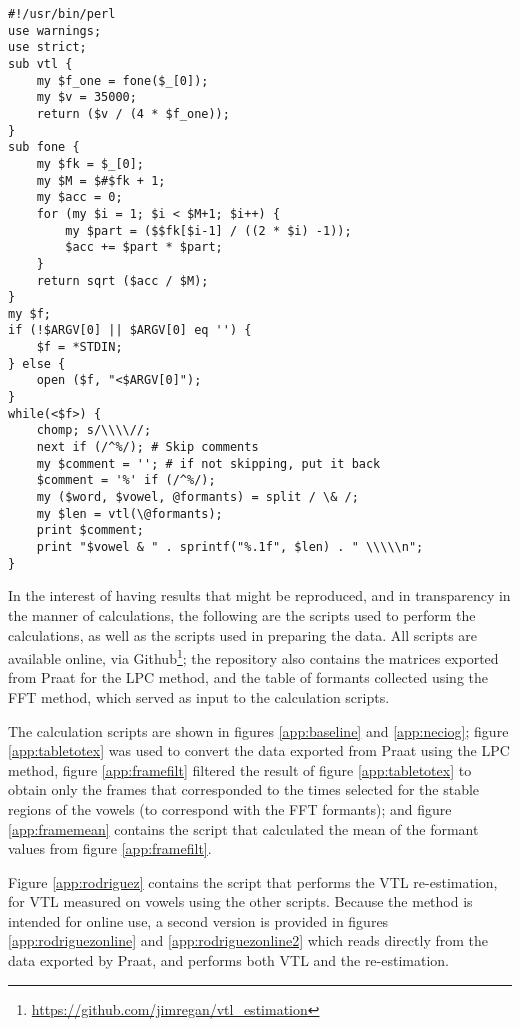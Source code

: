 \documentclass[11pt]{article}
\begin{document}
\begin{figure*}
\caption{Perl script to perform VTL using the method attributed to~\citet{necioglu2000unsupervised}.}
\label{app:neciog}
\begin{small}
\begin{verbatim}
#!/usr/bin/perl
use warnings;
use strict;
sub vtl {
    my $f_one = fone($_[0]);
    my $v = 35000;
    return ($v / (4 * $f_one));
}
sub fone {
    my $fk = $_[0];
    my $M = $#$fk + 1;
    my $acc = 0;
    for (my $i = 1; $i < $M+1; $i++) {
        my $part = ($$fk[$i-1] / ((2 * $i) -1));
        $acc += $part * $part;
    }
    return sqrt ($acc / $M);
}
my $f;
if (!$ARGV[0] || $ARGV[0] eq '') {
    $f = *STDIN;
} else {
    open ($f, "<$ARGV[0]");
}
while(<$f>) {
    chomp; s/\\\\//;
    next if (/^%/); # Skip comments
    my $comment = ''; # if not skipping, put it back
    $comment = '%' if (/^%/);
    my ($word, $vowel, @formants) = split / \& /;
    my $len = vtl(\@formants);
    print $comment;
    print "$vowel & " . sprintf("%.1f", $len) . " \\\\\n";
}
\end{verbatim}
\end{small}
\end{figure*}

In the interest of having results that might be reproduced, and in transparency in the manner of calculations, the following are the scripts used to perform the calculations, as well as the scripts used in preparing the data. All scripts are available online, via Github\footnote{\url{https://github.com/jimregan/vtl_estimation}}; the repository also contains the matrices exported from Praat for the LPC method, and the table of formants collected using the FFT method, which served as input to the calculation scripts.

The calculation scripts are shown in figures \ref{app:baseline} and \ref{app:neciog}; figure \ref{app:tabletotex} was used to convert the data exported from Praat using the LPC method, figure \ref{app:framefilt} filtered the result of figure \ref{app:tabletotex} to obtain only the frames that corresponded to the times selected for the stable regions of the vowels (to correspond with the FFT formants); and figure \ref{app:framemean} contains the script that calculated the mean of the formant values from figure \ref{app:framefilt}.

Figure \ref{app:rodriguez} contains the script that performs the VTL re-estimation, for VTL measured on vowels using the other scripts. Because the method is intended for online use, a second version is provided in figures \ref{app:rodriguezonline} and \ref{app:rodriguezonline2} which reads directly from the data exported by Praat, and performs both VTL and the re-estimation.
\end{document}
